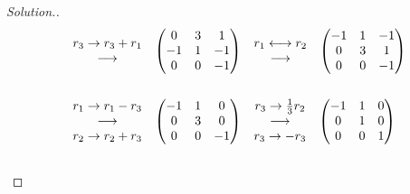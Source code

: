 \documentclass[11pt,a4paper]{article}
\theoremstyle{definition}
\newenvironment{solution}
  {\renewcommand{\qedsymbol}{}\begin{proof}[\textit{Solution}.]}
  {\end{proof}}
\begin{document}
\begin{solution}
\begin{align*}
&\hspace{0.3cm}
\begin{matrix}
r_3\rightarrow r_3+r_1\\ \longrightarrow\\
\end{matrix}
\hspace{0.3cm}
\begin{pmatrix}
0&3&1\\-1&1&-1\\0&0&-1\\
\end{pmatrix}
\hspace{0.3cm}
\begin{matrix}
r_1\longleftrightarrow r_2\\ \longrightarrow\\
\end{matrix}
\hspace{0.3cm}
\begin{pmatrix}
-1&1&-1\\0&3&1\\0&0&-1\\
\end{pmatrix}\\\\
& \hspace{0.3cm}
\begin{matrix}
r_1\rightarrow r_1-r_3\\ \longrightarrow \\ r_2\rightarrow r_2+r_3\\
\end{matrix}
\hspace{0.3cm}
\begin{pmatrix}
-1&1&0\\0&3&0\\0&0&-1\\
\end{pmatrix}
\hspace{0.3cm}
\begin{matrix}
r_3\rightarrow \frac{1}{3}r_2\\ \longrightarrow\\ r_3\rightarrow -r_3\\
\end{matrix}
\hspace{0.3cm}
\begin{pmatrix}
-1&1&0\\0&1&0\\0&0&1\\
\end{pmatrix}\\\\

\end{align*}
\end{solution}
\end{document}
